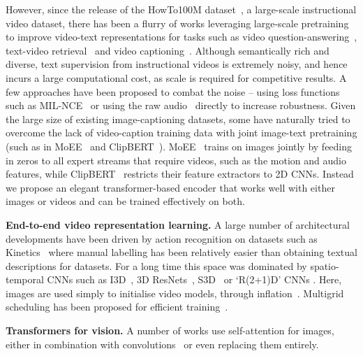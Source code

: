 \documentclass[10pt,twocolumn,letterpaper]{article}
\begin{document}
However, since the release of the HowTo100M dataset~\cite{miech2019howto100m}, a large-scale
instructional video dataset, there has been a flurry of works leveraging large-scale pretraining to
improve video-text representations for tasks such as video question-answering~\cite{seo2021look},
text-video retrieval~\cite{patrick2020support} and video captioning~\cite{zhou2018end}. Although semantically rich and diverse, text supervision from instructional videos is extremely noisy, and hence incurs a large computational cost, as scale is required for competitive results. A few approaches have been proposed to combat the noise --  \eg using loss functions such as MIL-NCE~\cite{miech20endtoend} or using the raw audio~\cite{alayrac2020self,rouditchenko2020avlnet} directly to increase robustness. Given the large size of existing image-captioning datasets, some have naturally tried to overcome the lack of video-caption training data with joint image-text pretraining (such as in MoEE~\cite{miech18learning} and ClipBERT~\cite{lei2021less}). MoEE~\cite{miech18learning} trains on images jointly by feeding in zeros to all expert streams that require videos, such as the motion and audio features, while ClipBERT~\cite{lei2021less} restricts their feature extractors to 2D CNNs. Instead we propose an elegant transformer-based encoder that works well with either images or videos and can be trained effectively on both.

\noindent\textbf{End-to-end video representation learning.}
A large number of architectural developments have been driven by action recognition
on datasets such as Kinetics~\cite{Kinetics} where manual labelling has been relatively easier than obtaining textual descriptions for datasets. For a long time this space was dominated by spatio-temporal CNNs such as I3D~\cite{Carreira2017},
3D ResNets~\cite{HaraCVPR2018}, S3D~\cite{xie2018rethinking}
or `R(2+1)D' CNNs \cite{Tran2018ACL}. Here, images are used simply to initialise video models, through inflation~\cite{Carreira2017}. Multigrid scheduling has been proposed for efficient training~\cite{Wu2020AMM}.

\noindent\textbf{Transformers for vision.} A number of works use self-attention for images, either in combination with convolutions~\cite{wang2018non,vaswani2017attention,hu2017relation,carion2020endtoend} or even replacing them entirely. 
\end{document}
